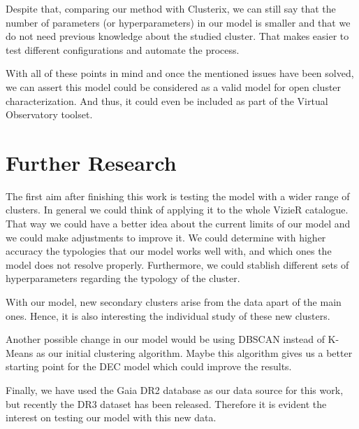 \documentclass[11pt, a4paper, english]{book}
\begin{document}
Despite that, comparing our method with Clusterix,
we can still say that the number of parameters (or hyperparameters) in our model is smaller
and that we do not need previous knowledge about the studied cluster.
That makes easier to test different configurations and automate the process.

With all of these points in mind and once the mentioned issues have been solved,
we can assert this model could be considered as a valid model for open cluster characterization.
And thus, it could even be included as part of the Virtual Observatory toolset.

\section{Further Research}

The first aim after finishing this work is testing the model with a wider range of clusters.
In general we could think of applying it to the whole VizieR catalogue.
That way we could have a better idea about the current limits of our model and we could make adjustments to improve it.
We could determine with higher accuracy the typologies that our model works well with,
and which ones the model does not resolve properly.
Furthermore, we could stablish different sets of hyperparameters regarding the typology of the cluster.

With our model, new secondary clusters arise from the data apart of the main ones.
Hence, it is also interesting the individual study of these new clusters.

Another possible change in our model would be using DBSCAN instead of K-Means as our initial clustering algorithm.
Maybe this algorithm gives us a better starting point for the DEC model which could improve the results.

Finally, we have used the Gaia DR2 database as our data source for this work,
but recently the DR3 dataset has been released.
Therefore it is evident the interest on testing our model with this new data.

\newpage




\end{document}
